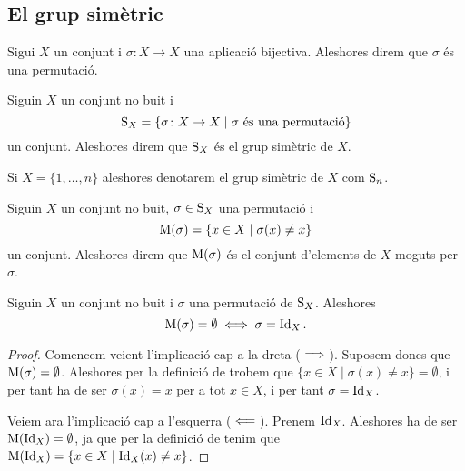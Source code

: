 \documentclass[../../Main.tex]{subfiles}
\begin{document}
	\subsection{El grup simètric}
	\begin{definition}[Permutació]
		\label{def:permutació}
		Sigui \(X\) un conjunt i \(\sigma\colon X\rightarrow X\) una aplicació bijectiva. Aleshores direm que \(\sigma\) és una permutació.
	\end{definition}
	\begin{definition}
		\label{def:grup simètric}
		Siguin \(X\) un conjunt no buit i
		\[\operatorname{S}_{X}=\{\sigma\colon X\rightarrow X\mid\sigma\text{ és una permutació}\}\]
		un conjunt. Aleshores direm que \(\operatorname{S}_{X}\) és el grup simètric de \(X\).
		
		Si \(X=\{1,\dots,n\}\) aleshores denotarem el grup simètric de \(X\) com \(\operatorname{S}_{n}\).
	\end{definition}
	\begin{definition}
		\label{def:conjunt d'elements moguts per una permutació}
		Siguin \(X\) un conjunt no buit, \(\sigma\in\operatorname{S}_{X}\) una permutació i
		\[\operatorname{M}(\sigma)=\{x\in X\mid\sigma(x)\neq x\}\]
		un conjunt. Aleshores direm que \(\operatorname{M}(\sigma)\) és el conjunt d'elements de \(X\) moguts per \(\sigma\).
	\end{definition}
	\begin{proposition}
		\label{prop:permutació identitat si i només si no mou res}
		\label{prop:permutació no mou res si i només si és la identitat}
		Siguin \(X\) un conjunt no buit i \(\sigma\) una permutació de \(\operatorname{S}_{X}\). Aleshores
		\[\operatorname{M}(\sigma)=\emptyset\iff\sigma=\operatorname{Id}_{X}.\]
		\begin{proof}
			Comencem veient l'implicació cap a la dreta (\(\implies\)). Suposem doncs que \(\operatorname{M}(\sigma)=\emptyset\). Aleshores per la definició de  trobem que \(\{x\in X\mid\sigma(x)\neq x\}=\emptyset\), i per tant ha de ser \(\sigma(x)=x\) per a tot \(x\in X\), i per tant \(\sigma=\operatorname{Id}_{X}\).
			
			Veiem ara l'implicació cap a l'esquerra (\(\impliedby\)). Prenem \(\operatorname{Id}_{X}\). Aleshores ha de ser \(\operatorname{M}(\operatorname{Id}_{X})=\emptyset\), ja que per la definició de  tenim que \(\operatorname{M}(\operatorname{Id}_{X})=\{x\in X\mid\operatorname{Id}_{X}(x)\neq x\}\).
		\end{proof}
	\end{proposition}
\end{document}

